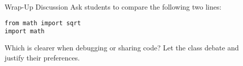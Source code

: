 \documentclass[12pt]{article}
\begin{document}
\begin{teacherbox}{Wrap-Up Discussion}
Ask students to compare the following two lines:
\begin{lstlisting}
from math import sqrt
import math
\end{lstlisting}
Which is clearer when debugging or sharing code?  
Let the class debate and justify their preferences.
\end{teacherbox}

\end{document}
